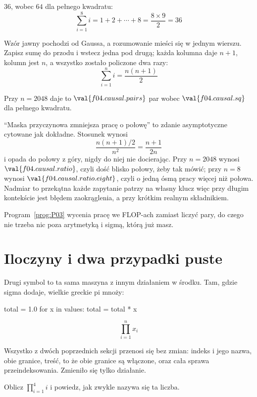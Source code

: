 \begin{fr}
\begin{ansblock}
$36$, wobec $64$ dla pełnego kwadratu:
\[ \sum_{i=1}^{8} i = 1 + 2 + \cdots + 8 = \frac{8 \times 9}{2} = 36 \]
\end{ansblock}

Wzór jawny pochodzi od Gaussa, a rozumowanie mieści się w jednym wierszu.
Zapisz sumę do przodu i wstecz jedna pod drugą; każda kolumna daje $n + 1$,
kolumn jest $n$, a wszystko zostało policzone dwa razy:
\[ \sum_{i=1}^{n} i = \frac{n(n+1)}{2} \]

Przy $n = 2048$ daje to $\val{f04.causal.pairs}$ par wobec
$\val{f04.causal.sq}$ dla pełnego kwadratu.

\begin{aibox}
\enquote{Maska przyczynowa zmniejsza pracę o połowę} to zdanie asymptotyczne
cytowane jak dokładne. Stosunek wynosi
\[ \frac{n(n+1)/2}{n^{2}} = \frac{n+1}{2n} \]
i opada do połowy z góry, nigdy do niej nie docierając. Przy $n = 2048$ wynosi
$\val{f04.causal.ratio}$, czyli dość blisko połowy, żeby tak mówić; przy
$n = 8$ wynosi $\val{f04.causal.ratio.eight}$, czyli o jedną ósmą pracy więcej
niż połowa. Nadmiar to przekątna \dash{} każde zapytanie patrzy na własny
klucz \dash{} więc przy długim kontekście jest błędem zaokrąglenia, a przy
krótkim realnym składnikiem.

Program~\ref{prog:P03} wycenia pracę we FLOP-ach zamiast liczyć pary, do
czego nie trzeba nic poza arytmetyką i sigmą, którą już masz.
\end{aibox}
\end{fr}


\section{Iloczyny i dwa przypadki puste}
\label{sec:F04-products}

\begin{fr}
Drugi symbol to ta sama maszyna z innym działaniem w środku. Tam, gdzie sigma
dodaje, wielkie greckie pi mnoży:

\begin{python}
total = 1.0
for x in values:
    total = total * x
\end{python}

\[ \prod_{i=1}^{n} x_i \]

Wszystko z dwóch poprzednich sekcji przenosi się bez zmian: indeks i jego
nazwa, obie granice, treść, to że obie granice są włączone, oraz cała sprawa
przeindeksowania. Zmieniło się tylko działanie.

Oblicz $\prod_{i=1}^{4} i$ i powiedz, jak zwykle nazywa się ta liczba.
\nextframe
\end{fr}

